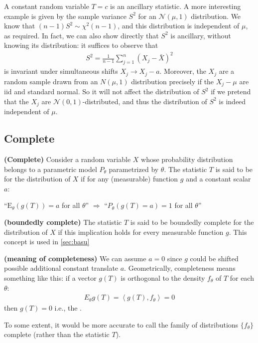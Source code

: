 \documentclass{article}
\newcommand{\bfs}[1]{\textbf{({#1}) }}
\begin{document}
\begin{exma}
  A constant random variable $T=c$ is an ancillary statistic. A more interesting example is given by the sample variance $S^{2}$ for an $\mathcal{N}(\mu, 1)$ distribution. We know that $(n-1) S^{2} \sim \chi^{2}(n-1)$, and this distribution is independent of $\mu$, as required. In fact, we can also show directly that $S^{2}$ is ancillary, without knowing its distribution: it suffices to observe that
\begin{align*}
S^{2}=\frac{1}{n-1} \sum_{j=1}^{n}\left(X_{j}-\bar{X}\right)^{2}
\end{align*}
is invariant under simultaneous shifts $X_{j} \rightarrow X_{j}-a$. Moreover, the $X_{j}$ are a random sample drawn from an $N(\mu, 1)$ distribution precisely if the $X_{j}-\mu$ are \gls{iid} and standard normal. So it will not affect the distribution of $S^{2}$ if we pretend that the $X_{j}$ are $\mathcal{N}(0,1)$-distributed, and thus the distribution of $S^{2}$ is indeed independent of $\mu$.
\end{exma}



\subsection{Complete}
\begin{defa}\bfs{Complete}
Consider a random variable $X$ whose probability distribution belongs to a parametric model ${P}_{\theta}$ parametrized by $\theta$.
The statistic $T$ is said to be  for the distribution of $X$ if for any (measurable) function $g$ and a constant scalar $a$:

\centerline{``$\mathrm{E}_{\theta}(g(T))=a$ for all $\theta$'' $\Rightarrow$ ``${P}_{\theta}(g(T)=a)=1$ for all $\theta$''}
\end{defa}
\begin{rema}\bfs{boundedly complete}\label{re:bcomple}
The statistic $T$ is said to be boundedly complete for the distribution of $X$ if this implication holds for every   measurable function $g$. This concept is used in \cref{sec:basu}
\end{rema}
\begin{rema}\bfs{meaning of completeness}\label{rem:complete_geo} We can assume $a=0$ since $g$ could be shifted possible additional constant translate $a$.
Geometrically, completeness means something like this: if a vector $g(T)$ is orthogonal to the density $f_{\theta}$ of $T$ for each $\theta$:
\begin{align*}
E_{\theta} g(T)=\left\langle g(T), f_{\theta}\right\rangle=0
\end{align*}
then $g(T)=0$ i.e., the .

To some extent, it would be more accurate to call the family of distributions $\{f_{\theta}\}$ complete (rather than the statistic $T$).
\end{rema}
\end{document}
